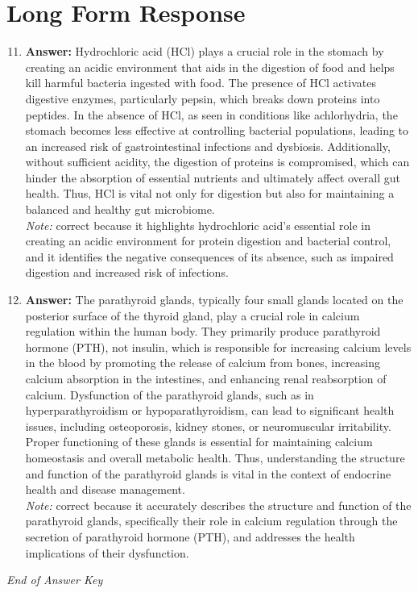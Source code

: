 \documentclass[12pt]{article}
\begin{document}
\section*{Long Form Response}
\begin{enumerate}[label=\arabic*.]
\setcounter{enumi}{10}
\item \textbf{Answer:} Hydrochloric acid (HCl) plays a crucial role in the stomach by creating an acidic environment that aids in the digestion of food and helps kill harmful bacteria ingested with food. The presence of HCl activates digestive enzymes, particularly pepsin, which breaks down proteins into peptides. In the absence of HCl, as seen in conditions like achlorhydria, the stomach becomes less effective at controlling bacterial populations, leading to an increased risk of gastrointestinal infections and dysbiosis. Additionally, without sufficient acidity, the digestion of proteins is compromised, which can hinder the absorption of essential nutrients and ultimately affect overall gut health. Thus, HCl is vital not only for digestion but also for maintaining a balanced and healthy gut microbiome.
\\ \textit{Note:} correct because it highlights hydrochloric acid's essential role in creating an acidic environment for protein digestion and bacterial control, and it identifies the negative consequences of its absence, such as impaired digestion and increased risk of infections.
\item \textbf{Answer:} The parathyroid glands, typically four small glands located on the posterior surface of the thyroid gland, play a crucial role in calcium regulation within the human body. They primarily produce parathyroid hormone (PTH), not insulin, which is responsible for increasing calcium levels in the blood by promoting the release of calcium from bones, increasing calcium absorption in the intestines, and enhancing renal reabsorption of calcium. Dysfunction of the parathyroid glands, such as in hyperparathyroidism or hypoparathyroidism, can lead to significant health issues, including osteoporosis, kidney stones, or neuromuscular irritability. Proper functioning of these glands is essential for maintaining calcium homeostasis and overall metabolic health. Thus, understanding the structure and function of the parathyroid glands is vital in the context of endocrine health and disease management.
\\ \textit{Note:} correct because it accurately describes the structure and function of the parathyroid glands, specifically their role in calcium regulation through the secretion of parathyroid hormone (PTH), and addresses the health implications of their dysfunction.
\end{enumerate}

\vfill
\noindent\textit{End of Answer Key}
\end{document}
